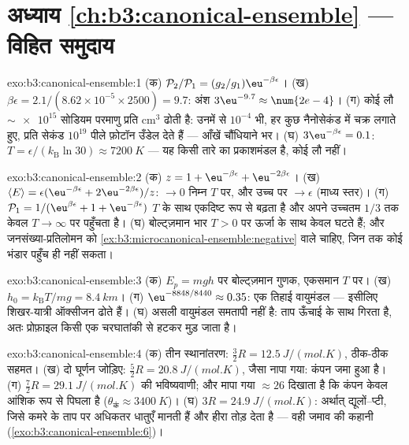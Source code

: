 \section*{अध्याय \ref{ch:b3:canonical-ensemble} --- विहित समुदाय}

\begin{solution}{exo:b3:canonical-ensemble:1}
(क) $\mathcal P_2/\mathcal P_1 = (g_2/g_1)\eu^{-\beta\epsilon}$।
(ख) $\beta\epsilon = 2.1/(8.62\times10^{-5} \times 2500) = 9.7$:
अंश $3\eu^{-9.7} \approx \num{2e-4}$। (ग) कोई लौ
$\sim\num{e15}$ सोडियम परमाणु प्रति cm$^3$ ढोती है: उनमें से $10^{-4}$ भी,
हर कुछ नैनोसेकंड में चक्र लगाते हुए, प्रति सेकंड $10^{19}$ पीले
फ़ोटॉन उँडेल देते हैं --- आँखें चौंधियाने भर। (घ) $3\eu^{-\beta\epsilon} = 0.1$:
$T = \epsilon/(k_{\text{B}}\ln30) \approx \qty{7200}{K}$ --- यह
किसी तारे का प्रकाशमंडल है, कोई लौ नहीं।
\end{solution}

\begin{solution}{exo:b3:canonical-ensemble:2}
(क) $z = 1 + \eu^{-\beta\epsilon} + \eu^{-2\beta\epsilon}$। (ख)
$\langle E\rangle = \epsilon(\eu^{-\beta\epsilon} +
2\eu^{-2\beta\epsilon})/z$: $\to 0$ निम्न $T$ पर, और उच्च पर
$\to \epsilon$ (माध्य स्तर)। (ग) $\mathcal P_1 = 1/(\eu^{\beta
\epsilon} + 1 + \eu^{-\beta\epsilon})$ $T$ के साथ एकदिष्ट रूप से
बढ़ता है और अपने उच्चतम $1/3$ तक केवल $T \to \infty$ पर पहुँचता है। (घ)
बोल्ट्ज़मान भार $T > 0$ पर ऊर्जा के साथ केवल घटते हैं; और
जनसंख्या-प्रतिलोमन को
\cref{ex:b3:microcanonical-ensemble:negative} वाले 
चाहिए, जिन तक कोई भंडार पहुँच ही नहीं सकता।
\end{solution}

\begin{solution}{exo:b3:canonical-ensemble:3}
(क) $E_p = mgh$ पर बोल्ट्ज़मान गुणक, एकसमान $T$ पर। (ख) $h_0 =
k_{\text{B}}T/mg = \qty{8.4}{km}$। (ग) $\eu^{-8848/8440} \approx
0.35$: एक तिहाई वायुमंडल --- इसीलिए शिखर-यात्री ऑक्सीजन ढोते हैं।
(घ) असली वायुमंडल समतापी नहीं है: ताप ऊँचाई के साथ गिरता है, अतः
प्रोफ़ाइल किसी एक चरघातांकी से हटकर मुड़ जाता है।
\end{solution}

\begin{solution}{exo:b3:canonical-ensemble:4}
(क) तीन स्थानांतरण: $\tfrac32 R = \qty{12.5}{J/(mol.K)}$,
ठीक-ठीक सहमत। (ख) दो घूर्णन जोड़िए: $\tfrac52 R =
\qty{20.8}{J/(mol.K)}$, जैसा नापा गया: कंपन जमा हुआ है। (ग)
$\tfrac72 R = \qty{29.1}{J/(mol.K)}$ की भविष्यवाणी; और मापा गया
$\approx26$ दिखाता है कि कंपन केवल आंशिक रूप से पिघला है ($\theta_{\text{कं}}
\approx \qty{3400}{K}$)। (घ) $3R = \qty{24.9}{J/(mol.K)}$:
अर्थात् द्यूलों--प्टी, जिसे कमरे के ताप पर अधिकतर धातुएँ मानती हैं
और हीरा तोड़ देता है --- वही जमाव की कहानी
(\cref{exo:b3:canonical-ensemble:6})।
\end{solution}

